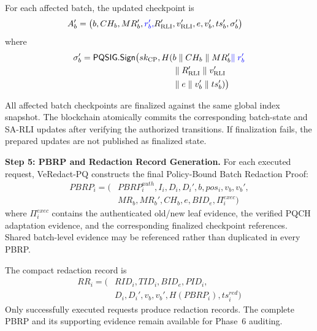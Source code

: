 \documentclass[lettersize,journal]{IEEEtran}
\begin{document}
For each affected batch, the updated
checkpoint is
\begin{equation}
\begin{aligned}
A_b'=\big(&b,CH_b,MR_b',\textcolor{blue}{r_b',}
R_{\mathrm{RLI}}',v_{\mathrm{RLI}}',e,v_b',
ts_b',\sigma_b'\big)
\end{aligned}
\end{equation}
where
\begin{equation}
\begin{aligned}
\sigma_b'=
\mathsf{PQSIG.Sign}\big(
sk_{\mathrm{CP}},
H(&b\parallel CH_b\parallel MR_b'\textcolor{blue}{\parallel r_b'}\\
&\parallel R_{\mathrm{RLI}}'\parallel v_{\mathrm{RLI}}'\\
&\parallel e\parallel v_b'\parallel ts_b')\big)
\end{aligned}
\end{equation}

All affected batch checkpoints are finalized
against the same global index snapshot.
The blockchain atomically commits the
corresponding batch-state and SA-RLI updates
after verifying the authorized transitions.
If finalization fails, the prepared updates
are not published as finalized state.

\medskip
\noindent\textbf{Step 5: PBRP and Redaction
Record Generation.}
For each executed request, VeRedact-PQ
constructs the final Policy-Bound Batch
Redaction Proof:
\begin{equation}
\begin{aligned}
PBRP_i=\big(
&PBRP_i^{auth},I_i,D_i,D_i',b,pos_i,v_b,v_b',\\&MR_b,MR_b',CH_b,e,BID_e,\Pi_i^{exec}\big)
\end{aligned}
\end{equation}
where $\Pi_i^{exec}$ contains the
authenticated old/new leaf evidence,
the verified PQCH adaptation evidence,
and the corresponding finalized checkpoint
references. Shared batch-level evidence
may be referenced rather than duplicated
in every PBRP.

The compact redaction record is
\begin{equation}
\begin{aligned}
RR_i=\big(
&RID_i,TID_i,BID_e,PID_i,\\
&D_i,D_i',v_b,v_b',
H(PBRP_i),ts_i^{red}\big)
\end{aligned}
\end{equation}
Only successfully executed requests
produce redaction records. The complete
PBRP and its supporting evidence remain
available for Phase~6 auditing.
\end{document}

